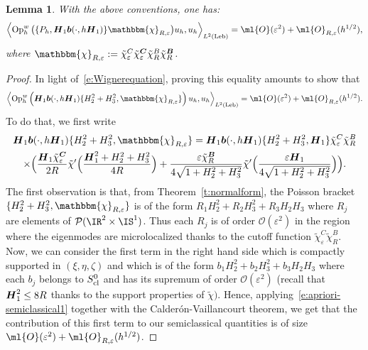 \documentclass[JEP,XML,SOM,Unicode, NoEqCountersInSection,published]{cedram}
\let\bm\mathbbm
\theoremstyle{plain}
\newtheorem{lemm}[theo]{Lemma}
\theoremstyle{definition}
\theoremstyle{remark}
\newcommand{\Op}{\operatorname{Op}}
\begin{document}
\begin{lemm}\label{l:remove-cutoff}
With the above conventions, one has:
\begin{equation}
\left\langle \Op_h^w\big(\{P_h, \boldsymbol{H}_1\boldsymbol{b}(\cdot,h\boldsymbol{H}_1)\} \bm{\chi}_{R,\varepsilon} \big)u_h,u_h\right\rangle_{L^2(\operatorname{Leb})}=\ml{O}(\varepsilon^2)+\ml{O}_{R,\varepsilon}(h^{1/2}),
\end{equation}
where $\bm{\chi}_{R,\varepsilon} := \tilde{\chi}_\varepsilon^C\tilde{\chi}_\varepsilon^{\boldsymbol{C}} \tilde{\chi}_R^B\tilde{\chi}_R^{\boldsymbol{B}}$.
\end{lemm}

\begin{proof}
In light of~\eqref{e:Wignerequation}, proving this equality amounts to show that
\[
\left\langle \Op_h^w\left(\boldsymbol{H}_1\boldsymbol{b}(\cdot,h\boldsymbol{H}_1)\{H_2^2+H_3^2,\bm{\chi}_{R,\varepsilon}\}\right)u_h,u_h\right\rangle_{L^2(\text{Leb})}=\ml{O}(\varepsilon^2)+\ml{O}_{R,\varepsilon}(h^{1/2}).
\]
To do that, we first write
\begin{multline*}
\boldsymbol{H}_1\boldsymbol{b}(\cdot,h\boldsymbol{H}_1)\{H_2^2+H_3^2,\bm{\chi}_{R,\varepsilon}\}=\boldsymbol{H}_1\boldsymbol{b}(\cdot,h\boldsymbol{H}_1)\{H_2^2+H_3^2,\boldsymbol{H}_1\}\tilde{\chi}_\varepsilon^C\tilde{\chi}_R^B\\
\times\Bigl(\frac{\boldsymbol{H}_1 \tilde{\chi}_\varepsilon^{\boldsymbol{C}} }{2R}\tilde{\chi}'\Bigl(\frac{\boldsymbol{H}_1^2+H_2^2+H_3^2}{4R}\Bigr)+\frac{\varepsilon\tilde{\chi}_R^{\boldsymbol{B}}}{4\sqrt{1+H_2^2+H_3^2}}\tilde{\chi}'\Bigl(\frac{\varepsilon\boldsymbol{H}_1}{4\sqrt{1+H_2^2+H_3^2}}\Bigr)\Bigr).
\end{multline*}
The first observation is that, from Theorem~\ref{t:normalform}, the Poisson bracket $\{H_2^2+H_3^2,\bm{\chi}_{R,\varepsilon}\}$ is of the form $R_1H_2^2+R_2 H_3^2+R_3H_2H_3$ where $R_j$ are elements of $\mathcal{P}(\IR^2\times\IS^1)$. Thus each $R_j$ is of order $\mathcal{O}(\varepsilon^2)$ in the region where the eigenmodes are microlocalized thanks to the cutoff function $\tilde{\chi}_\varepsilon^C\tilde{\chi}_R^B$. Now, we can consider the first term in the right hand side which is compactly supported in $(\xi,\eta,\zeta)$ and which is of the form $b_1H_2^2+b_2H_3^2+b_3H_2H_3$ where each $b_j$ belongs to $S_{\textup{cl}}^0$ and has its supremum of order $\mathcal{O}(\varepsilon^2)$ (recall that $\boldsymbol{H}_1^2\leq\nobreak 8R$ thanks to the support properties of $\tilde{\chi})$. Hence, applying~\eqref{e:apriori-semiclassical1} together with the Calderón-Vaillancourt theorem, we get that the contribution of this first term to our semiclassical quantities is of size $\ml{O}(\varepsilon^2)+\ml{O}_{R,\varepsilon}(h^{1/2})$.


\end{proof}
\end{document}
